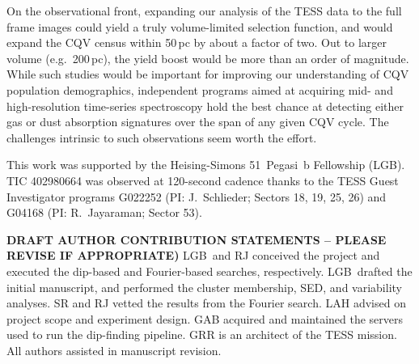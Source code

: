 \documentclass[11pt,twocolumn,tighten]{aastex63}
\begin{document}
On the observational front, expanding our analysis of the TESS data to the full frame images
could yield a truly volume-limited selection function, and would
expand the CQV census within 50\,pc by about a factor of two.
Out to larger volume (e.g.~200\,pc), the yield boost would be more
than an order of magnitude.
While such studies would be important for improving our understanding
of CQV population demographics,
independent programs aimed at acquiring
mid- and high-resolution time-series spectroscopy hold the best chance
at detecting
either gas or dust absorption signatures over the span of any
given CQV cycle.
The challenges intrinsic to such observations seem worth the effort.




\acknowledgments
This work was supported by the 
Heising-Simons 51~Pegasi~b Fellowship (LGB).
TIC 402980664 was observed at 120-second cadence thanks to the TESS Guest
Investigator programs G022252 (PI: J.~Schlieder; Sectors 18, 19, 25,
26) and G04168 (PI: R.~Jayaraman; Sector 53).

{\bf DRAFT AUTHOR CONTRIBUTION STATEMENTS -- PLEASE REVISE IF 
	APPROPRIATE)}
LGB~and RJ conceived the project and executed the
dip-based and Fourier-based searches, respectively.
LGB~drafted the initial manuscript, and performed the cluster
membership, SED, and variability analyses.
SR and RJ vetted the results from the Fourier search.
LAH advised on project scope and experiment design.
GAB acquired and maintained the servers used to run the dip-finding
pipeline.
GRR is an architect of the TESS mission.
All authors assisted in manuscript revision.

\end{document}
